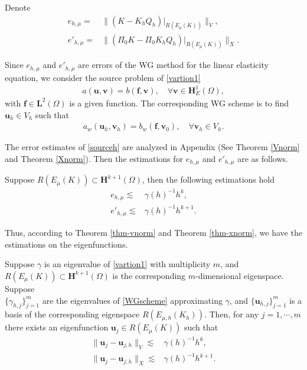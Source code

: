 \documentclass[leqno,CJK]{siamltex704}
\numberwithin{equation}{section}
\def\bu{{\mathbf{u}}}
\def\bv{{\mathbf{v}}}
\def\bl{{\mathbf{L}}}
\def\bh{{\mathbf{H}}}
\def\bf{{\mathbf{f}}}
\begin{document}
Denote
\begin{align*}
	e_{h,\mu} =& \|( K-K_hQ_h)|_{R(E_\mu(K))}\|_V,
	\\
	e'_{h,\mu} =& \|(\Pi_0 K-\Pi_0K_hQ_h)|_{R(E_\mu(K))}\|_X.
\end{align*}

Since $e_{h,\mu}$ and $e'_{h,\mu}$ are errors of the WG method for the linear elasticity equation, we consider the source problem of \eqref{vartion1}
\begin{eqnarray}\label{source}
	a(\bu,\bv)=b(\bf,\bv),\quad\forall\bv\in\bh_E^1(\Omega),
\end{eqnarray}
with $\bf\in\bl^2(\Omega)$ is a given function. The corresponding WG scheme
is to find $\bu_h\in V_h$ such that
\begin{eqnarray}\label{sourceh}
	a_w(\bu_h,\bv_h)=b_w(\bf,\bv_0),\quad \forall\bv_h\in V_h.
\end{eqnarray}

The error estimates of \eqref{sourceh} are analyzed in Appendix (See Theorem \ref{Vnorm} and Theorem \ref{Xnorm}). Then the estimations for $e_{h,\mu}$ and $e'_{h,\mu}$ are as follows.
\begin{lemma}\label{e}
	Suppose $R(E_\mu(K))\subset\bh^{k+1}(\Omega)$, then the following estimations hold
	\begin{align*}
		e_{h,\mu} \lesssim & \gamma(h)^{-1}h^k,\\
		e'_{h,\mu} \lesssim & \gamma(h)^{-1}h^{k+1}.
	\end{align*}
\end{lemma}

Thus, according to Theorem \ref{thm-vnorm} and Theorem \ref{thm-xnorm}, we have the
estimations on the eigenfunctions.
\begin{theorem}\label{eigenvector}
	Suppose $\gamma$ is an eigenvalue of \eqref{vartion1} with multiplicity $m$,
	and $R(E_\mu(K))\subset\bh^{k+1}(\Omega)$ is the corresponding $m$-dimensional eigenspace. Suppose \\ $\{\gamma_{h,j}\}_{j=1}^m$
	are the eigenvalues of \eqref{WGscheme} approximating $\gamma$, and $\{\bu_{h,j}\}_{j=1}^m$ is
	a basis of the corresponding eigenspace $R(E_{\mu,h}(K_h))$. Then, for any $j=1,\cdots,m$ there
	exists an eigenfunction $\bu_j\in R(E_\mu(K))$ such that
	\begin{align*}
		\|\bu_j-\bu_{j,h}\|_V \lesssim & \gamma(h)^{-1}h^k,
		\\
		\|\bu_j-\bu_{j,h}\|_X \lesssim & \gamma(h)^{-1}h^{k+1}.
	\end{align*}
\end{theorem}
\end{document}
